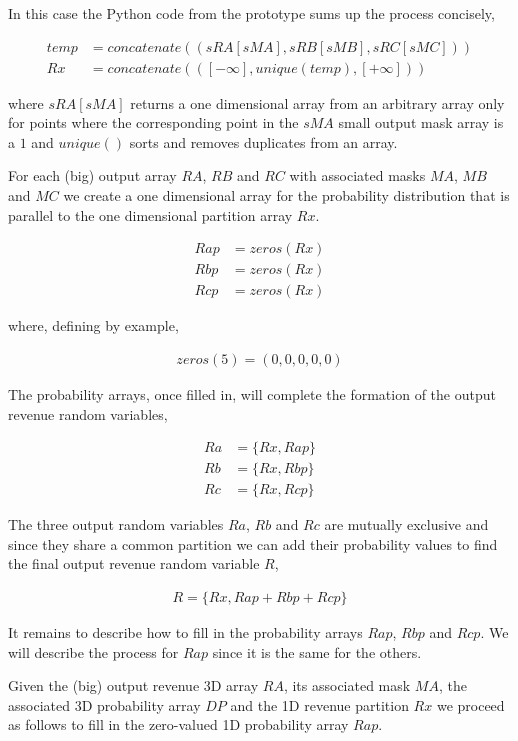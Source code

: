 In this case the Python code from the prototype sums up the process concisely,

\begin{align*}
temp &= concatenate((sRA[sMA], sRB[sMB], sRC[sMC]))\\
Rx &= concatenate(([-\infty], unique(temp), [+\infty]))
\end{align*}

where $sRA[sMA]$ returns a one dimensional array from an arbitrary array
only for points where the corresponding point in the $sMA$ small
output mask array is a $1$ and $unique()$ sorts and removes duplicates
from an array. 

For each (big) output array $RA$, $RB$ and $RC$ with associated masks
$MA$, $MB$ and $MC$ we create a one dimensional array for the
probability distribution that is parallel to the one dimensional
partition array $Rx$. 

\begin{align*}
Rap &= zeros(Rx)\\
Rbp &= zeros(Rx)\\
Rcp &= zeros(Rx)
\end{align*}

where, defining by example,

\begin{align*}
zeros(5) = (0, 0, 0, 0, 0)
\end{align*}

The probability arrays, once filled in, will complete the formation of
the output revenue random variables,

\begin{align*}
Ra &= \{Rx, Rap\}\\
Rb &= \{Rx, Rbp\}\\
Rc &= \{Rx, Rcp\}
\end{align*}

The three output random variables $Ra$, $Rb$ and $Rc$ are mutually
exclusive and since they share a common partition we can add their
probability values to find the final output revenue random variable $R$,

\begin{align*}
R = \{Rx, Rap + Rbp + Rcp\}
\end{align*}

It remains to describe how to fill in the probability arrays $Rap$,
$Rbp$ and $Rcp$. We will describe the process for $Rap$ since it is
the same for the others.

Given the (big) output revenue 3D array $RA$, its associated mask
$MA$, the associated 3D probability array $DP$ and the 1D revenue
partition $Rx$ we proceed as follows to fill in the zero-valued 1D
probability array $Rap$. 

